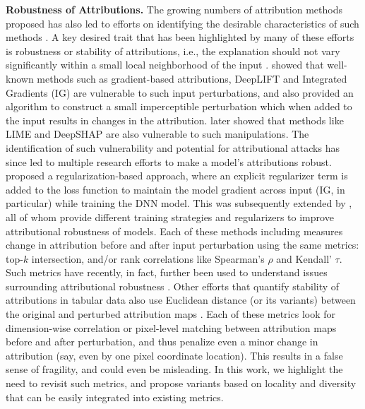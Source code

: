 \documentclass[letterpaper]{article} %
\begin{document}
\noindent \textbf{Robustness of Attributions.} The growing numbers of attribution methods proposed has also led to efforts on identifying the desirable characteristics of such methods \citep{alvarez2018robustness,AdebayoGMGHK18,yeh2019fidelity,ChalasaniC00J20,TomsettHCGP20,Boggust22Faithful,agarwal2022rethinking}. A key desired trait that has been highlighted by many of these efforts is robustness or stability of attributions, i.e., the explanation should not vary significantly within a small local neighborhood of the input \citep{alvarez2018robustness,ChalasaniC00J20}. \citet{ghorbani2018interpretation} showed that well-known methods such as gradient-based attributions, DeepLIFT \citep{shrikumar2019learning} and Integrated Gradients (IG) \citep{SundararajanTY17} are vulnerable to such input perturbations, and also provided an algorithm to construct a small imperceptible perturbation which when added to the input results in changes in the attribution.  \citet{slack2020fooling} later showed that methods like LIME \citep{ribeiro2016why} and DeepSHAP \citep{lundberg2017unified} are also vulnerable to such manipulations. The identification of such vulnerability and potential for attributional attacks has since led to multiple research efforts to make a model's attributions robust. \citet{chen2019robust} proposed a regularization-based approach, where an explicit regularizer term is added to the loss function to maintain the model gradient across input (IG, in particular) while training the DNN model. This was subsequently extended by \citep{sarkar2020enhanced,singh2020attributional,wang2020smoothed}, all of whom provide different training strategies and regularizers to improve attributional robustness of models. Each of these methods including \citet{ghorbani2018interpretation} measures change in attribution before and after input perturbation using the same metrics: top-$k$ intersection, and/or rank correlations like Spearman's $\rho$ and Kendall' $\tau$. Such metrics have recently, in fact, further been used to understand issues surrounding attributional robustness \citep{Wang22Kendall}. Other efforts that quantify stability of attributions in tabular data also use Euclidean distance (or its variants) between the original and perturbed attribution maps  \citep{alvarez2018robustness,yeh2019fidelity,agarwal2022rethinking}. Each of these metrics look for dimension-wise correlation or pixel-level matching between attribution maps before and after perturbation, and thus penalize even a minor change in attribution (say, even by one pixel coordinate location). This results in a false sense of fragility, and could even be misleading. In this work, we highlight the need to revisit such metrics, and propose variants based on locality and diversity that can be easily integrated into existing metrics.
\end{document}
